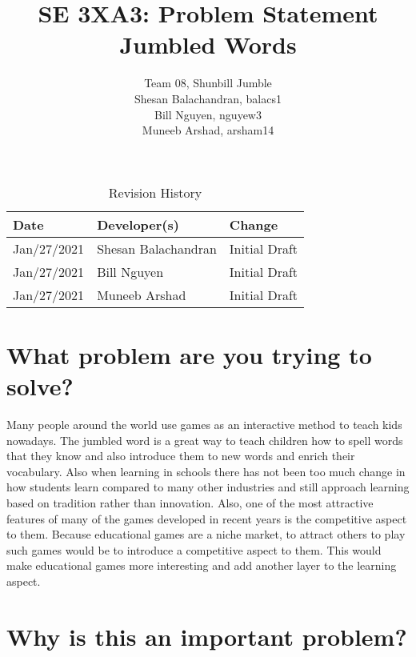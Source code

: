 \documentclass{article}
\title{SE 3XA3: Problem Statement\\Jumbled Words}
\author{Team 08, Shunbill Jumble
		\\Shesan Balachandran, balacs1
		\\Bill Nguyen, nguyew3
		\\Muneeb Arshad, arsham14
}
\date{}
\begin{document}
\begin{table}[hp]
\caption{Revision History} \label{TblRevisionHistory}
\begin{tabularx}{\textwidth}{llX}
\toprule
\textbf{Date} & \textbf{Developer(s)} & \textbf{Change}\\
\midrule
Jan/27/2021 & Shesan Balachandran & Initial Draft\\
Jan/27/2021 & Bill Nguyen & Initial Draft\\
Jan/27/2021 & Muneeb Arshad & Initial Draft\\
\bottomrule
\end{tabularx}
\end{table}

\newpage

\maketitle

\section{What problem are you trying to solve?}

Many people around the world use games as an interactive method to teach kids nowadays. The jumbled word is a great way to teach children how to spell words that they know and also introduce them to new words and enrich their vocabulary. Also when learning in schools there has not been too much change in how students learn compared to many other industries and still approach learning based on tradition rather than innovation. Also, one of the most attractive features of many of the games developed in recent years is the competitive aspect to them. Because educational games are a niche market, to attract others to play such games would be to introduce a competitive aspect to them. This would make educational games more interesting and add another layer to the learning aspect.

\section{Why is this an important problem?}
\end{document}

